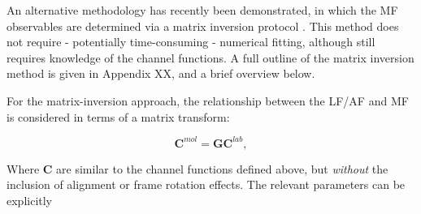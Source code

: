 An alternative methodology has recently been demonstrated, in which the MF observables are determined via a matrix inversion protocol \cite{gregory2021MolecularFramePhotoelectron}. This method does not require - potentially time-consuming - numerical fitting, although still requires knowledge of the channel functions. A full outline of the matrix inversion method is given in Appendix XX, and a brief overview below.

For the matrix-inversion approach, the relationship between the LF/AF and MF is considered in terms of a matrix transform:

\begin{equation}
\mathbf{C}^{mol}=\mathbf{G}\mathbf{C}^{lab},\label{eq:basic}
\end{equation}

Where $\mathbf{C}$ are similar to the channel functions defined above, but \textit{without} the inclusion of alignment or frame rotation effects. The relevant parameters can be explicitly


